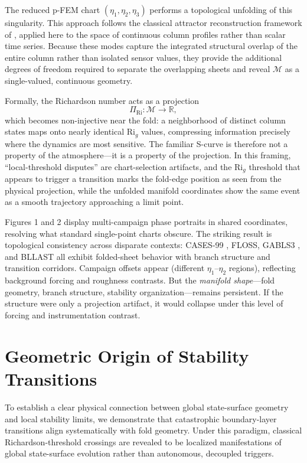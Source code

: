 \documentclass[12pt,a4paper]{article}
\newcommand{\Rig}{\mathrm{Ri}_g}
\begin{document}
The reduced p-FEM chart $(\eta_1,\eta_2,\eta_3)$ performs a topological unfolding of this singularity. This approach follows the classical attractor reconstruction framework of \citep{ruelle1971, takens1981}, applied here to the space of continuous column profiles rather than scalar time series. Because these modes capture the integrated structural overlap of the entire column rather than isolated sensor values, they provide the additional degrees of freedom required to separate the overlapping sheets and reveal $\mathcal{M}$ as a single-valued, continuous geometry.

Formally, the Richardson number acts as a projection
\begin{equation}
\Pi_{\mathrm{Ri}} : \mathcal{M} \rightarrow \mathbb{R},
\end{equation}
which becomes non-injective near the fold: a neighborhood of distinct column states maps onto nearly identical $\Rig$ values, compressing information precisely where the dynamics are most sensitive. The familiar S-curve is therefore not a property of the atmosphere---it is a property of the projection. In this framing, ``local-threshold disputes'' are chart-selection artifacts, and the $\Rig$ threshold that appears to trigger a transition marks the fold-edge position as seen from the physical projection, while the unfolded manifold coordinates show the same event as a smooth trajectory approaching a limit point.

Figures 1 and 2 display multi-campaign phase portraits in shared coordinates, resolving what standard single-point charts obscure. The striking result is topological consistency across disparate contexts: CASES-99 \citep{poulos2002}, FLOSS, GABLS3 \citep{beare2004}, and BLLAST all exhibit folded-sheet behavior with branch structure and transition corridors. Campaign offsets appear (different $\eta_1$--$\eta_2$ regions), reflecting background forcing and roughness contrasts. But the \emph{manifold shape}---fold geometry, branch structure, stability organization---remains persistent. If the structure were only a projection artifact, it would collapse under this level of forcing and instrumentation contrast.

\section{Geometric Origin of Stability Transitions}

To establish a clear physical connection between global state-surface geometry and local stability limits, we demonstrate that catastrophic boundary-layer transitions align systematically with fold geometry. Under this paradigm, classical Richardson-threshold crossings are revealed to be localized manifestations of global state-surface evolution rather than autonomous, decoupled triggers.
\end{document}
